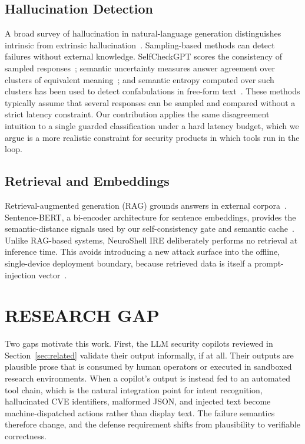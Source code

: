 \documentclass[a4paper,twoside]{article}
\begin{document}
\subsection{Hallucination Detection}

\noindent A broad survey of hallucination in natural-language generation distinguishes intrinsic from extrinsic hallucination~\cite{Ji23}. Sampling-based methods can detect failures without external knowledge. SelfCheckGPT scores the consistency of sampled responses~\cite{Manakul23}; semantic uncertainty measures answer agreement over clusters of equivalent meaning~\cite{Kuhn23}; and semantic entropy computed over such clusters has been used to detect confabulations in free-form text~\cite{Farquhar24}. These methods typically assume that several responses can be sampled and compared without a strict latency constraint. Our contribution applies the same disagreement intuition to a single guarded classification under a hard latency budget, which we argue is a more realistic constraint for security products in which tools run in the loop.

\subsection{Retrieval and Embeddings}

\noindent Retrieval-augmented generation (RAG) grounds answers in external corpora~\cite{Lewis20}. Sentence-BERT, a bi-encoder architecture for sentence embeddings, provides the semantic-distance signals used by our self-consistency gate and semantic cache~\cite{Reimers19}. Unlike RAG-based systems, NeuroShell IRE deliberately performs no retrieval at inference time. This avoids introducing a new attack surface into the offline, single-device deployment boundary, because retrieved data is itself a prompt-injection vector~\cite{Greshake23}.


\section{\uppercase{Research Gap}}
\label{sec:gap}

\noindent Two gaps motivate this work. First, the LLM security copilots reviewed in Section~\ref{sec:related} validate their output informally, if at all. Their outputs are plausible prose that is consumed by human operators or executed in sandboxed research environments. When a copilot's output is instead fed to an automated tool chain, which is the natural integration point for intent recognition, hallucinated CVE identifiers, malformed JSON, and injected text become machine-dispatched actions rather than display text. The failure semantics therefore change, and the defense requirement shifts from plausibility to verifiable correctness.
\end{document}
